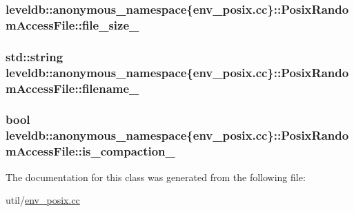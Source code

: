 \subsubsection[{file\+\_\+size\+\_\+}]{ leveldb\+::anonymous\+\_\+namespace\{env\+\_\+posix.\+cc\}\+::Posix\+Random\+Access\+File\+::file\+\_\+size\+\_\+\hspace{0.3cm}{\ttfamily [private]}}\label{classleveldb_1_1anonymous__namespace_02env__posix_8cc_03_1_1_posix_random_access_file_a0cf03f48463600214d56266251172073}
\hypertarget{classleveldb_1_1anonymous__namespace_02env__posix_8cc_03_1_1_posix_random_access_file_a9e2d89928eddfba0d5935433630a3569}{}
\subsubsection[{filename\+\_\+}]{\setlength{\rightskip}{0pt plus 5cm}std\+::string leveldb\+::anonymous\+\_\+namespace\{env\+\_\+posix.\+cc\}\+::Posix\+Random\+Access\+File\+::filename\+\_\+\hspace{0.3cm}{\ttfamily [private]}}\label{classleveldb_1_1anonymous__namespace_02env__posix_8cc_03_1_1_posix_random_access_file_a9e2d89928eddfba0d5935433630a3569}
\hypertarget{classleveldb_1_1anonymous__namespace_02env__posix_8cc_03_1_1_posix_random_access_file_a9a33d399b94f73cdc546e250a9152279}{}
\subsubsection[{is\+\_\+compaction\+\_\+}]{\setlength{\rightskip}{0pt plus 5cm}bool leveldb\+::anonymous\+\_\+namespace\{env\+\_\+posix.\+cc\}\+::Posix\+Random\+Access\+File\+::is\+\_\+compaction\+\_\+\hspace{0.3cm}{\ttfamily [private]}}\label{classleveldb_1_1anonymous__namespace_02env__posix_8cc_03_1_1_posix_random_access_file_a9a33d399b94f73cdc546e250a9152279}


The documentation for this class was generated from the following file\+:\begin{DoxyCompactItemize}
\item 
util/\hyperlink{env__posix_8cc}{env\+\_\+posix.\+cc}\end{DoxyCompactItemize}
